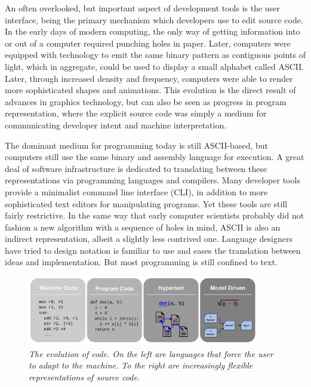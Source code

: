 \documentclass[12pt,initial,twoside,maitrise]{dms}
\numberwithin{equation}{section}
\numberwithin{table}{chapter}
\numberwithin{figure}{chapter}
\begin{document}
An often overlooked, but important aspect of development tools is the user interface, being the primary mechanism which developers use to edit source code. In the early days of modern computing, the only way of getting information into or out of a computer required punching holes in paper. Later, computers were equipped with technology to emit the same binary pattern as contiguous points of light, which in aggregate, could be used to display a small alphabet called ASCII. Later, through increased density and frequency, computers were able to render more sophisticated shapes and animations. This evolution is the direct result of advances in graphics technology, but can also be seen as progress in program representation, where the explicit source code was simply a medium for communicating developer intent and machine interpretation.

The dominant medium for programming today is still ASCII-based, but computers still use the same binary and assembly language for execution. A great deal of software infrastructure is dedicated to translating between these representations via programming languages and compilers. Many developer tools provide a minimalist command line interface (CLI), in addition to more sophisticated text editors for manipulating programs. Yet these tools are still fairly restrictive. In the same way that early computer scientists probably did not fashion a new algorithm with a sequence of holes in mind, ASCII is also an indirect representation, albeit a slightly less contrived one. Language designers have tried to design notation is familiar to use and eases the translation between ideas and implementation. But most programming is still confined to text.

\begin{figure}
    \centering
    \includegraphics[width=0.90\textwidth]{progress_in_program.png}
    \caption{\textit{The evolution of code. On the left are languages that force the user to adapt to the machine. To the right are increasingly flexible representations of source code.}}
    \label{fig:evolution_of_programming}
\end{figure}
\end{document}
